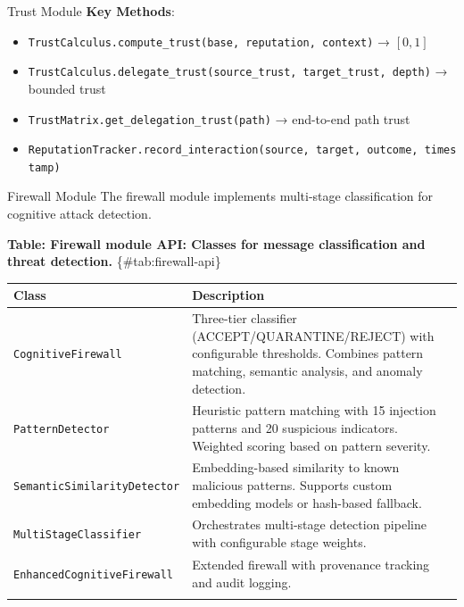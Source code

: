 \documentclass[
  ignorenonframetext,
]{beamer}
\newcounter{none} %
\providecommand{\tightlist}{%
  \setlength{\itemsep}{0pt}\setlength{\parskip}{0pt}}
\begin{document}
\begin{frame}[fragile]{Trust Module}
\textbf{Key Methods}:

\begin{itemize}
\tightlist
\item
  \texttt{TrustCalculus.compute\_trust(base,\ reputation,\ context)} →
  \([0, 1]\)
\item
  \texttt{TrustCalculus.delegate\_trust(source\_trust,\ target\_trust,\ depth)}
  → bounded trust
\item
  \texttt{TrustMatrix.get\_delegation\_trust(path)} → end-to-end path
  trust
\item
  \texttt{ReputationTracker.record\_interaction(source,\ target,\ outcome,\ timestamp)}
\end{itemize}
\end{frame}

\begin{frame}[fragile]{Firewall Module}
\protect{}\label{sec:firewall-api}
The firewall module implements multi-stage classification for cognitive
attack detection.

\textbf{Table: Firewall module API: Classes for message classification
and threat detection.} \{\#tab:firewall-api\}

{\def\LTcaptype{none} %
\begin{longtable}[]{@{}
  >{\raggedright\arraybackslash}p{}
  >{\raggedright\arraybackslash}p{}@{}}
\toprule\noalign{}
\begin{minipage}[b]{\linewidth}\raggedright
Class
\end{minipage} & \begin{minipage}[b]{\linewidth}\raggedright
Description
\end{minipage} \\
\midrule\noalign{}
\endhead
\texttt{CognitiveFirewall} & Three-tier classifier
(ACCEPT/QUARANTINE/REJECT) with configurable thresholds. Combines
pattern matching, semantic analysis, and anomaly detection. \\
\texttt{PatternDetector} & Heuristic pattern matching with 15 injection
patterns and 20 suspicious indicators. Weighted scoring based on pattern
severity. \\
\texttt{SemanticSimilarityDetector} & Embedding-based similarity to
known malicious patterns. Supports custom embedding models or hash-based
fallback. \\
\texttt{MultiStageClassifier} & Orchestrates multi-stage detection
pipeline with configurable stage weights. \\
\texttt{EnhancedCognitiveFirewall} & Extended firewall with provenance
tracking and audit logging. \\
\bottomrule\noalign{}
\end{longtable}
}


\end{frame}
\end{document}
